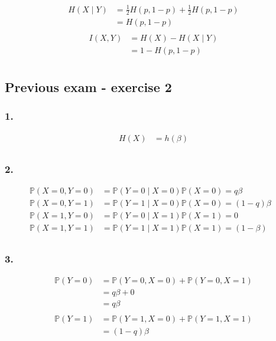 \documentclass{article}
\newcommand{\1}{\mathbf{1}}
\renewcommand{\P}{\mathbb{P}}
\begin{document}
\begin{align*}
  H(X \mid Y)
   & = \frac{1}{2} H(p, 1-p) + \frac{1}{2} H(p, 1-p) \\
   & = H(p, 1-p)                                     \\
\end{align*}
\begin{align*}
  I(X, Y)
   & = H(X) - H(X \mid Y) \\
   & = 1 - H(p, 1-p)      \\
\end{align*}

\subsection{Previous exam - exercise 2}
\subsubsection{1.}
\begin{align*}
  H(X)
   & = h(\beta) \\
\end{align*}

\subsubsection{2.}
\begin{align*}
  \P(X = 0, Y = 0) & = \P(Y = 0 \mid X = 0) \P(X = 0) = q \beta      & \\
  \P(X = 0, Y = 1) & = \P(Y = 1 \mid X = 0) \P(X = 0) = (1- q) \beta & \\
  \P(X = 1, Y = 0) & = \P(Y = 0 \mid X = 1) \P(X = 1) = 0            & \\
  \P(X = 1, Y = 1) & = \P(Y = 1 \mid X = 1) \P(X = 1) = (1 - \beta)  & \\
\end{align*}

\subsubsection{3.}
\begin{align*}
  \P(Y = 0)
   & = \P(Y = 0, X = 0) + \P(Y = 0, X = 1) \\
   & = q \beta + 0                         \\
   & = q \beta                             \\
\end{align*}
\begin{align*}
  \P(Y = 1)
   & = \P(Y = 1, X = 0) + \P(Y = 1, X = 1) \\
   & = (1 - q) \beta                       \\
\end{align*}
\end{document}
